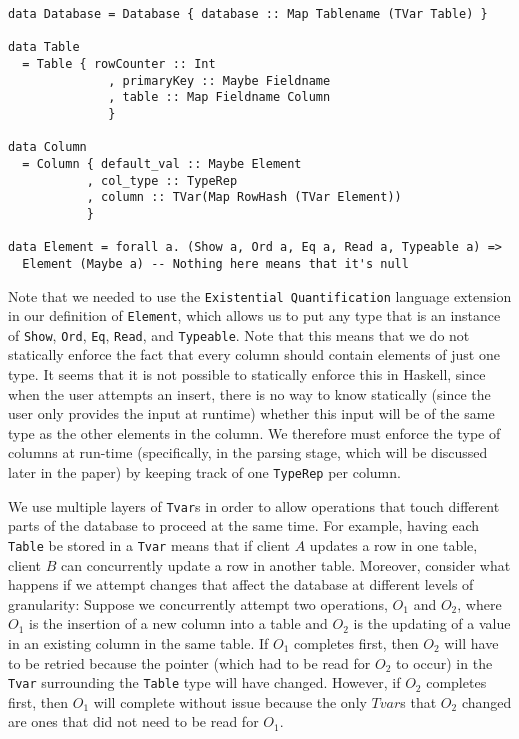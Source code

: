 \documentclass[10pt]{article}
\begin{document}
\begin{multicols}{2}
\noindent\begin{minipage}{.45\textwidth}
\begin{lstlisting}[caption=The data structures used to build up a table.,frame=tlrb, breaklines=true]
data Database = Database { database :: Map Tablename (TVar Table) }

data Table 
  = Table { rowCounter :: Int 
              , primaryKey :: Maybe Fieldname 
              , table :: Map Fieldname Column
              }

data Column 
  = Column { default_val :: Maybe Element
           , col_type :: TypeRep
           , column :: TVar(Map RowHash (TVar Element))
           } 

data Element = forall a. (Show a, Ord a, Eq a, Read a, Typeable a) => 
  Element (Maybe a) -- Nothing here means that it's null
\end{lstlisting}
\end{minipage}\hfill

Note that we needed to use the \texttt{Existential Quantification} language extension in our definition of \texttt{Element}, which allows us to put any type that is an instance of \texttt{Show}, \texttt{Ord}, \texttt{Eq}, \texttt{Read}, and \texttt{Typeable}.  Note that this means that we do not statically enforce the fact that every column should contain elements of just one type. It seems that it is not possible to statically enforce this in Haskell, since when the user attempts an insert, there is no way to know statically (since the user only provides the input at runtime) whether this input will be of the same type as the other elements in the column. We therefore must enforce the type of columns at run-time (specifically, in the parsing stage, which will be discussed later in the paper) by keeping track of one \texttt{TypeRep} per column. 

We use multiple layers of \texttt{Tvar}s in order to allow operations that touch different parts of the database to proceed at the same time. For example, having each \texttt{Table} be stored in a \texttt{Tvar} means that if client $A$ updates a row in one table, client $B$ can concurrently update a row in another table. Moreover, consider what happens if we attempt changes that affect the database at different levels of granularity: Suppose we concurrently attempt two operations, $O_1$ and $O_2$, where $O_1$ is the insertion of a new column into a table and $O_2$ is the updating of a value in an existing column in the same table. If $O_1$ completes first, then $O_2$ will have to be retried because the pointer (which had to be read for $O_2$ to occur) in the \texttt{Tvar} surrounding the \texttt{Table} type will have changed. However, if $O_2$ completes first, then $O_1$ will complete without issue because the only $Tvar$s that $O_2$ changed are ones that did not need to be read for $O_1$. 



\end{multicols}
\end{document}
